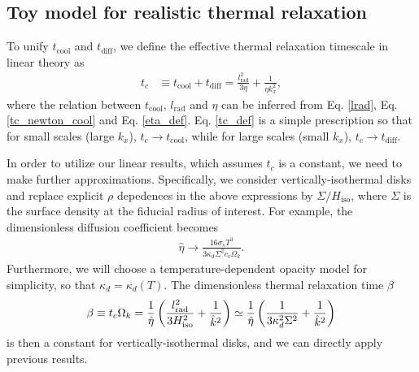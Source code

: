 \subsection{Toy model for realistic thermal relaxation}\label{toy_relax}
To unify $t_\mathrm{cool}$ and $t_\mathrm{diff}$, we define the
effective thermal relaxation timescale in linear theory as
\begin{align}\label{tc_def}
  t_c &\equiv t_\mathrm{cool} + t _\mathrm{diff} =
  \frac{l_\mathrm{rad}^2}{3\eta} + \frac{1}{\eta k_x^2},  
\end{align}
where the relation between $t_\mathrm{cool}$, $l_\mathrm{rad}$ and
$\eta$ can be inferred from Eq. \ref{lrad}, Eq. \ref{tc_newton_cool}
and Eq. \ref{eta_def}. Eq. \ref{tc_def} is a simple prescription so
that for small scales (large $k_x$), $t_c\to t_\mathrm{cool}$, while
for large scales (small $k_x$), $t_c\to t_\mathrm{diff}$. 

In order to utilize our linear results, which assumes $t_c$ is a
constant, we need to make further 
approximations. Specifically, we consider vertically-isothermal disks
and replace explicit $\rho$ depedences in the above expressions by $\Sigma/
H_\mathrm{iso}$, where $\Sigma$ is the surface density at the fiducial
radius of interest. For example, the dimensionless diffusion
coefficient becomes 
\begin{align}\label{diff_coeff_dimensionless}
  \hat{\eta} \to  \frac{16\sigma_s T^3}{3\kappa_d\Sigma^2
    c_v\Omega_k}. 
\end{align}
Furthermore, we will choose a temperature-dependent opacity model for
simplicity, so that $\kappa_d=\kappa_d(T)$. The dimensionless thermal
relaxation time $\beta$  
\begin{align}\label{real_beta}
  \beta \equiv t_c\Omega_k =
  \frac{1}{\hat{\eta}}\left(\frac{l_\mathrm{rad}^2}{3H_\mathrm{iso}^2}
    + \frac{1}{\hat{k}^2}\right)  \simeq
  \frac{1}{\hat{\eta}}\left(\frac{1}{3\kappa_d^2\Sigma^2} 
    + \frac{1}{\hat{k}^2}\right)
\end{align}
is then a constant for vertically-isothermal disks, 
and we can directly apply previous results. 

